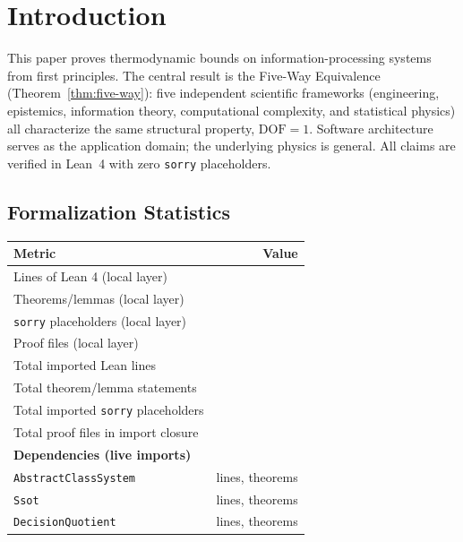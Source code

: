 \section{Introduction}\label{introduction}

This paper proves thermodynamic bounds on information-processing systems from first principles. The central result is the Five-Way Equivalence (Theorem~\ref{thm:five-way}): five independent scientific frameworks (engineering, epistemics, information theory, computational complexity, and statistical physics) all characterize the same structural property, $\mathrm{DOF} = 1$. Software architecture serves as the application domain; the underlying physics is general. All claims are verified in Lean~4 with zero \texttt{sorry} placeholders.

\subsection{Formalization Statistics}

\begin{center}
\begin{tabular}{lr}
\hline
\textbf{Metric} & \textbf{Value} \\
\hline
Lines of Lean 4 (local layer) & \LeanLocalLines{} \\
Theorems/lemmas (local layer) & \LeanLocalTheorems{} \\
\texttt{sorry} placeholders (local layer) & \LeanLocalSorry{} \\
Proof files (local layer) & \LeanLocalFiles{} \\
\hline
Total imported Lean lines & \LeanTotalLines{} \\
Total theorem/lemma statements & \LeanTotalTheorems{} \\
Total imported \texttt{sorry} placeholders & \LeanTotalSorry{} \\
Total proof files in import closure & \LeanTotalFiles{} \\
\hline
\textbf{Dependencies (live imports)} & \\
\texttt{AbstractClassSystem} & \LeanDepLinesAbstractClassSystem{} lines, \LeanDepTheoremsAbstractClassSystem{} theorems \\
\texttt{Ssot} & \LeanDepLinesSsot{} lines, \LeanDepTheoremsSsot{} theorems \\
\texttt{DecisionQuotient} & \LeanDepLinesDecisionQuotient{} lines, \LeanDepTheoremsDecisionQuotient{} theorems \\
\hline
\end{tabular}
\end{center}

